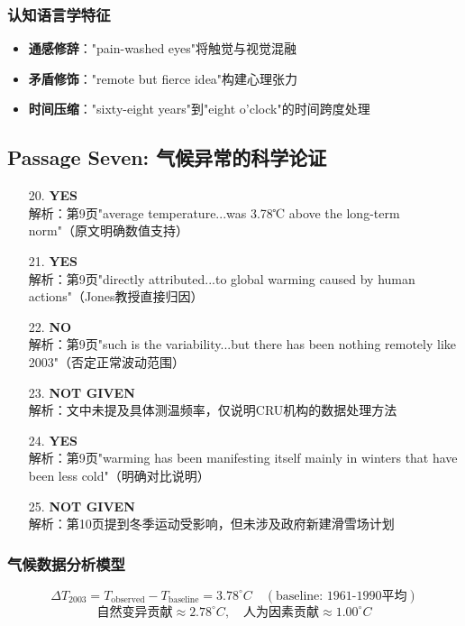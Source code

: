 \documentclass{article}
\begin{document}
\subsubsection*{认知语言学特征}
\begin{itemize}
    \item \textbf{通感修辞}："pain-washed eyes"将触觉与视觉混融
    \item \textbf{矛盾修饰}："remote but fierce idea"构建心理张力
    \item \textbf{时间压缩}："sixty-eight years"到"eight o'clock"的时间跨度处理
\end{itemize}


\subsection*{Passage Seven: 气候异常的科学论证}
\begin{enumerate}
    \item[20.] \textbf{YES} \\ 
    解析：第9页"average temperature...was 3.78℃ above the long-term norm"（原文明确数值支持）
    
    \item[21.] \textbf{YES} \\
    解析：第9页"directly attributed...to global warming caused by human actions"（Jones教授直接归因）
    
    \item[22.] \textbf{NO} \\
    解析：第9页"such is the variability...but there has been nothing remotely like 2003"（否定正常波动范围）
    
    \item[23.] \textbf{NOT GIVEN} \\
    解析：文中未提及具体测温频率，仅说明CRU机构的数据处理方法
    
    \item[24.] \textbf{YES} \\
    解析：第9页"warming has been manifesting itself mainly in winters that have been less cold"（明确对比说明）
    
    \item[25.] \textbf{NOT GIVEN} \\
    解析：第10页提到冬季运动受影响，但未涉及政府新建滑雪场计划
\end{enumerate}

\subsubsection*{气候数据分析模型}
\[
\Delta T_{2003} = T_{\text{observed}} - T_{\text{baseline}} = 3.78^\circ C \quad (\text{baseline: 1961-1990平均})
\]
\[
\text{自然变异贡献} \approx 2.78^\circ C, \quad \text{人为因素贡献} \approx 1.00^\circ C
\]
\end{document}
